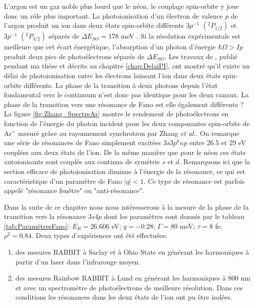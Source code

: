 L'argon est un gaz noble plus lourd que le néon, le couplage spin-orbite y joue donc un rôle plus important. La photoionisation d'un électron de valence $p$ de l'argon produit un ion dans deux états spin-orbite différents $3p^{-1}$ $(^{2}P_{1/2})$ et $3p^{-1}$ $(^{2}P_{3/2})$ séparés de $\Delta E_{SO} = 178$ meV . Si la résolution expérimentale est meilleure que cet écart énergétique, l'absorption d'un photon d'énergie $\hbar \Omega > Ip$ produit deux pics de photoélectrons séparés de $\Delta E_{SO}$. Les travaux de , publié pendant ma thèse et décrits au chapitre \ref{chap:DelaiPI}, ont montré qu'il existe un délai de photoionisation entre les électrons laissant l'ion dans deux états spin-orbite différents. La phase de la transition à deux photons depuis l'état fondamental vers le continuum n'est donc pas identique pour les deux canaux. La phase de la transition vers une résonance de Fano est elle également différente ? La figure \ref{fig:Zhang_SpectreAr} montre le rendement de photoélectrons en fonction de l'énergie du photon incident pour les deux composantes spin-orbite de Ar$^+$ mesuré grâce au rayonnement synchrotron par Zhang \textit{et al.}. On remarque une série de résonances de Fano simplement excitées $3s3p^{6}np$ entre 26.5 et 29 eV couplées aux deux états de l'ion. De la même manière que pour le néon ces états autoionisants sont couplés aux continua de symétrie $s$ et $d$. Remarquons ici que la section efficace de photoionisation diminue à l'énergie de la résonance, ce qui est caractéristique d'un paramètre de Fano $|q| < 1$. Ce type de résonance est parfois appelé "résonance fenêtre" ou "anti-résonance".

Dans la suite de ce chapitre nous nous intéresserons à la mesure de la phase de la transition vers la résonance $3s4p$ dont les paramètres sont donnés par le tableau \ref{tab:ParamètresFano}: $E_R = 26.606$ eV; $q = -0.28$; $\Gamma =  80$ meV; $\tau = 8$ fs; $\rho^2 = 0.84$. Deux types d'expériences ont été effectuées:
\begin{enumerate}
\item des mesures RABBIT à Saclay et à Ohio State en générant les harmoniques à partir d'un laser dans l'infrarouge moyen.
\item des mesures Rainbow RABBIT à Lund en générant les harmoniques à 800 nm et avec un spectromètre de photoélectrons de meilleure résolution. Dans ces conditions les résonances dans les deux états de l'ion ont pu être isolées.
\end{enumerate}

